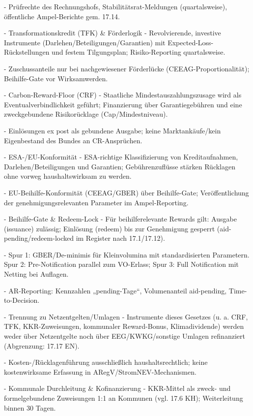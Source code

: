 \documentclass[12pt,a4paper]{scrartcl}
\begin{document}
- Prüfrechte des Rechnungshofs, Stabilitätsrat-Meldungen (quartalsweise), öffentliche Ampel-Berichte gem. 17.14.

- Transformationskredit (TFK) \& Förderlogik
- Revolvierende, investive Instrumente (Darlehen/Beteiligungen/Garantien) mit Expected-Loss-Rückstellungen und festem Tilgungsplan; Risiko-Reporting quartalsweise.

- Zuschussanteile nur bei nachgewiesener Förderlücke (CEEAG-Proportionalität); Beihilfe-Gate vor Wirksamwerden.

- Carbon-Reward-Floor (CRF)
- Staatliche Mindestauszahlungszusage wird als Eventualverbindlichkeit geführt; Finanzierung über Garantiegebühren und eine zweckgebundene Risikorücklage (Cap/Mindestniveau).

- Einlösungen ex post als gebundene Ausgabe; keine Marktankäufe/kein Eigenbestand des Bundes an CR-Ansprüchen.

- ESA-/EU-Konformität
- ESA-richtige Klassifizierung von Kreditaufnahmen, Darlehen/Beteiligungen und Garantien; Gebührenzuflüsse stärken Rücklagen ohne vorweg haushaltswirksam zu werden.

- EU-Beihilfe-Konformität (CEEAG/GBER) über Beihilfe-Gate; Veröffentlichung der genehmigungsrelevanten Parameter im Ampel-Reporting.

- Beihilfe-Gate \& Redeem-Lock
- Für beihilferelevante Rewards gilt: Ausgabe (issuance) zulässig; Einlösung (redeem) bis zur Genehmigung gesperrt (aid-pending/redeem-locked im Register nach 17.1/17.12).

- Spur 1: GBER/De-minimis für Kleinvolumina mit standardisierten Parametern. Spur 2: Pre-Notification parallel zum VO-Erlass; Spur 3: Full Notification mit Netting bei Auflagen.

- AR-Reporting: Kennzahlen „pending-Tage“, Volumenanteil aid-pending, Time-to-Decision.

- Trennung zu Netzentgelten/Umlagen
- Instrumente dieses Gesetzes (u. a. CRF, TFK, KKR-Zuweisungen, kommunaler Reward-Bonus, Klimadividende) werden weder über Netzentgelte noch über EEG/KWKG/sonstige Umlagen refinanziert (Abgrenzung: 17.17 EN).

- Kosten-/Rücklagenführung ausschließlich haushaltsrechtlich; keine kostenwirksame Erfassung in ARegV/StromNEV-Mechanismen.

- Kommunale Durchleitung \& Kofinanzierung
- KKR-Mittel als zweck- und formelgebundene Zuweisungen 1:1 an Kommunen (vgl. 17.6 KH); Weiterleitung binnen 30 Tagen.
\end{document}
